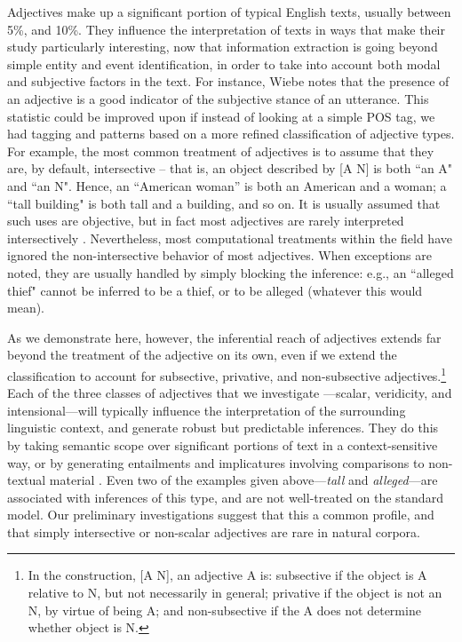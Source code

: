 \documentclass[10pt]{article}
\begin{document}
Adjectives make up a significant portion of typical English texts, usually between 5\%, and 10\%. They influence the interpretation of texts in ways that make their study particularly interesting, now that information extraction is going beyond simple entity and event identification, in order to take into account both modal and subjective factors in the text. For instance, Wiebe \cite{wiebe2000learning} notes that the presence of an adjective is a good indicator of the subjective stance of an utterance. This statistic could be improved upon if instead of looking at a simple POS tag, we had  tagging and patterns based on a more refined  classification of adjective types. For example, the most common treatment of adjectives is to assume that they are, by default, {\sc intersective} -- that is, an  object described by [A N] is both ``an A" and ``an N". Hence, an ``American woman'' is both an American and a woman; a ``tall building" is both tall and a building, and so on. 
It is usually assumed that such uses are objective, but in fact most adjectives are rarely interpreted intersectively \cite{giegerich2005associative}. Nevertheless, most computational treatments  within the field have ignored the non-intersective behavior of most adjectives.   When exceptions are noted, they are usually handled by simply blocking the inference: e.g., an ``alleged thief" cannot be inferred to be a thief, or to be alleged (whatever this would mean). 


As we demonstrate here, however,  the inferential reach of adjectives extends far beyond the treatment of the adjective on its own,  even if we extend the classification to  account for subsective, privative, and non-subsective adjectives.\footnote{
In the construction, [A N], an adjective A is:  {\sc subsective} if the object is A relative to N, but not necessarily in general; {\sc privative} if the object 
 is not an N, by virtue of being A; and 
 {\sc non-subsective} if the A  does not determine whether object is N.}
 Each of the three classes of adjectives that we investigate ---scalar, veridicity, and intensional---will typically influence the interpretation  of the surrounding linguistic context, and generate robust but  predictable inferences.  They do this by taking semantic scope over significant portions of text in a context-sensitive way, or by generating entailments and implicatures involving comparisons to non-textual material 
  \cite{lassiter14adjectives}. 
%
Even two of the examples given above---\emph{tall} and \emph{alleged}---are associated with inferences of this type, and are not well-treated on the standard model. Our preliminary investigations suggest that this a common profile, and that simply intersective or non-scalar adjectives are rare in natural corpora.
\end{document}
